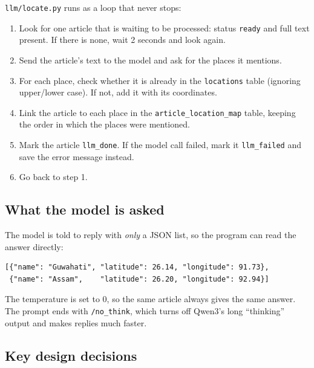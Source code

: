 \documentclass[11pt,a4paper]{article}
\newcommand{\code}[1]{\texttt{#1}}
\begin{document}
\code{llm/locate.py} runs as a loop that never stops:

\begin{enumerate}
  \item Look for one article that is waiting to be processed: status \code{ready} and full text present. If there is none, wait 2 seconds and look again.
  \item Send the article's text to the model and ask for the places it mentions.
  \item For each place, check whether it is already in the \code{locations} table (ignoring upper/lower case). If not, add it with its coordinates.
  \item Link the article to each place in the \code{article\_location\_map} table, keeping the order in which the places were mentioned.
  \item Mark the article \code{llm\_done}. If the model call failed, mark it \code{llm\_failed} and save the error message instead.
  \item Go back to step 1.
\end{enumerate}

\subsection{What the model is asked}

The model is told to reply with \emph{only} a JSON list, so the program can read
the answer directly:

\begin{lstlisting}
[{"name": "Guwahati", "latitude": 26.14, "longitude": 91.73},
 {"name": "Assam",    "latitude": 26.20, "longitude": 92.94}]
\end{lstlisting}

The temperature is set to 0, so the same article always gives the same answer.
The prompt ends with \code{/no\_think}, which turns off Qwen3's long
``thinking'' output and makes replies much faster.

\subsection{Key design decisions}
\end{document}
